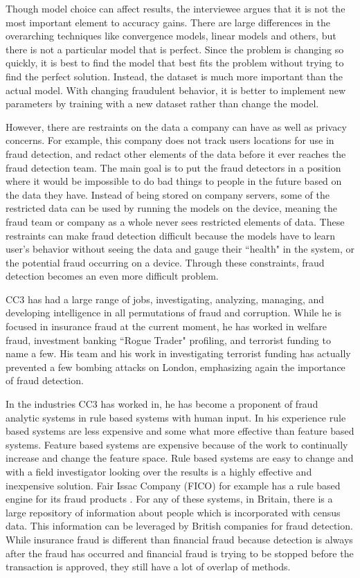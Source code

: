 \documentclass[midd]{thesis}
\begin{document}
Though model choice can affect results, the interviewee argues that it is not the most important element to accuracy gains. There are large differences in the overarching techniques like convergence models, linear models and others, but there is not a particular model that is perfect. Since the problem is changing so quickly, it is best to find the model that best fits the problem without trying to find the perfect solution. Instead, the dataset is much more important than the actual model. With changing fraudulent behavior, it is better to implement new parameters by training with a new dataset rather than change the model. 

However, there are restraints on the data a company can have as well as privacy concerns. For example, this company does not track users locations for use in fraud detection, and redact other elements of the data before it ever reaches the fraud detection team. The main goal is to put the fraud detectors in a position where it would be impossible to do bad things to people in the future based on the data they have. Instead of being stored on company servers, some of the restricted data can be used by running the models on the device, meaning the fraud team or company as a whole never sees restricted elements of data. These restraints can make fraud detection difficult because the models have to learn user's behavior without seeing the data and gauge their ``health" in the system, or the potential fraud occurring on a device. Through these constraints, fraud detection becomes an even more difficult problem.

CC3 has had a large range of jobs, investigating, analyzing, managing, and developing intelligence in all permutations of fraud and corruption. While he is focused in insurance fraud at the current moment, he has worked in welfare fraud, investment banking ``Rogue Trader" profiling, and terrorist funding to name a few. His team and his work in investigating terrorist funding has actually prevented a few bombing attacks on London, emphasizing again the importance of fraud detection. 

In the industries CC3 has worked in, he has become a proponent of fraud analytic systems in rule based systems with human input. In his experience rule based systems are less expensive and some what more effective than feature based systems. Feature based systems are expensive because of the work to continually increase and change the feature space. Rule based systems are easy to change and with a field investigator looking over the results is a highly effective and inexpensive solution. Fair Issac Company (FICO) for example has a rule based engine for its fraud products \cite{FICO}. For any of these systems, in Britain, there is a large repository of information about people which is incorporated with census data. This information can be leveraged by British companies for fraud detection. While insurance fraud is different than financial fraud because detection is always after the fraud has occurred and financial fraud is trying to be stopped before the transaction is approved, they still have a lot of overlap of methods.
\end{document}
